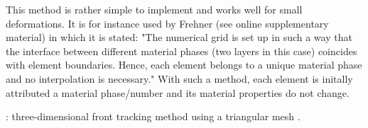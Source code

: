 This method is rather simple to implement and works well for small deformations. It is 
for instance used by Frehner \cite{freh14} (see online supplementary material) in which it is 
stated: "The numerical grid is set up in such a way that the interface
between different material phases (two layers in this case) coincides with element boundaries. Hence, each
element belongs to a unique material phase and no interpolation is necessary."
With such a method, each element is initally attributed a material phase/number and its material
properties do not change. 


\vspace{2cm} 

\Literature: three-dimensional front tracking method using a triangular mesh \cite{sclo03}.







